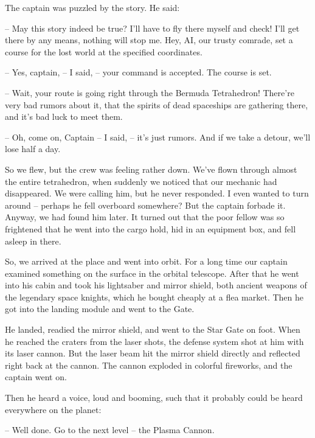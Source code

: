 \documentclass[ebook,twoside,final,openright]{memoir}
\begin{document}
\par
The captain was puzzled by the story. He said:\par
– May this story indeed be true? I’ll have to fly there myself and check! I'll get there by any means, nothing will stop me. Hey, AI, our trusty comrade, set a course for the lost world at the specified coordinates.\par
– Yes, captain, – I said, – your command is accepted. The course is set.\par
– Wait, your route is going right through the Bermuda Tetrahedron! There’re very bad rumors about it, that the spirits of dead spaceships are gathering there, and it’s bad luck to meet them.\par
– Oh, come on, Captain – I said, – it’s just rumors. And if we take a detour, we’ll lose half a day.\par
\par
So we flew, but the crew was feeling rather down. We’ve flown through almost the entire tetrahedron, when suddenly we noticed that our mechanic had disappeared. We were calling him, but he never responded. I even wanted to turn around – perhaps he fell overboard somewhere? But the captain forbade it. Anyway, we had found him later. It turned out that the poor fellow was so frightened that he went into the cargo hold, hid in an equipment box, and fell asleep in there.\par
\par
So, we arrived at the place and went into orbit. For a long time our captain examined something on the surface in the orbital telescope. After that he went into his cabin and took his lightsaber and mirror shield, both ancient weapons of the legendary space knights, which he bought cheaply at a flea market. Then he got into the landing module and went to the Gate.\par
\par
He landed, readied the mirror shield, and went to the Star Gate on foot. When he reached the craters from the laser shots, the defense system shot at him with its laser cannon. But the laser beam hit the mirror shield directly and reflected right back at the cannon. The cannon exploded in colorful fireworks, and the captain went on.\par
\par
Then he heard a voice, loud and booming, such that it probably could be heard everywhere on the planet:\par
– Well done. Go to the next level – the Plasma Cannon.\par
\end{document}
